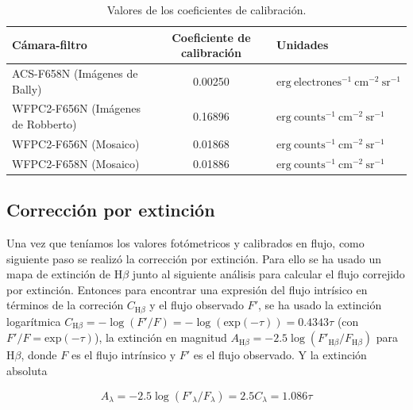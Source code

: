 \begin{table}[htp]
\centering
\small\raggedright
\renewcommand{\arraystretch}{1.5}
\caption{Valores de los coeficientes de calibración.}
  \label{tab:table-constans}

\begin{tabular}{ |l| |c| |l| }
\hline
Cámara-filtro&                       Coeficiente de calibración&       Unidades\\ \hline 
ACS-F658N (Imágenes de Bally)&       0.00250 &                          \(\mathrm{erg~electrones^{-1}~cm^{-2}~sr^{-1}}\)\\
WFPC2-F656N (Imágenes de Robberto)&  0.16896 &                          \(\mathrm{erg~counts^{-1}~cm^{-2}~sr^{-1}}\)\\
WFPC2-F656N (Mosaico)&               0.01868 &                          \(\mathrm{erg~counts^{-1}~cm^{-2}~sr^{-1}}\)\\
WFPC2-F658N (Mosaico)&               0.01886 &                          \(\mathrm{erg~counts^{-1}~cm^{-2}~sr^{-1}}\)\\ 
\hline
 \end{tabular} 
 \end{table}
\normalsize

\subsection{Corrección por extinción}
\label{sec:extintion}

Una vez que teníamos los valores fotómetricos y calibrados en flujo, como siguiente paso se realizó la corrección por extinción. Para ello se ha usado un mapa de extinción de \(\text{H}\beta\) junto al siguiente análisis para calcular el flujo correjido por extinción. Entonces para encontrar una expresión del flujo intrísico en términos de la correción \(C_{\text{H}\beta}\) y el flujo observado \(F'\), se ha usado la extinción logarítmica \(C_{\text{H}\beta} = -\log(F'/F) = -\log (\text{exp}(-\tau)) = 0.4343\tau\) (con \(F'/F = \text{exp}(-\tau)\)),  la extinción en magnitud \(A_{\text{H}\beta}=-2.5\log(F'_{\text{H}\beta}/F_{\text{H}\beta})\) para  \(\text{H}\beta\), donde  \(F\) es el flujo intrínsico y \(F'\) es el flujo observado. Y la extinción absoluta  

\begin{equation}
A_{\lambda}=-2.5\log(F'_{\lambda}/F_{\lambda})=2.5C_{\lambda}=1.086\tau
\label{eq:exti}
\end{equation}

